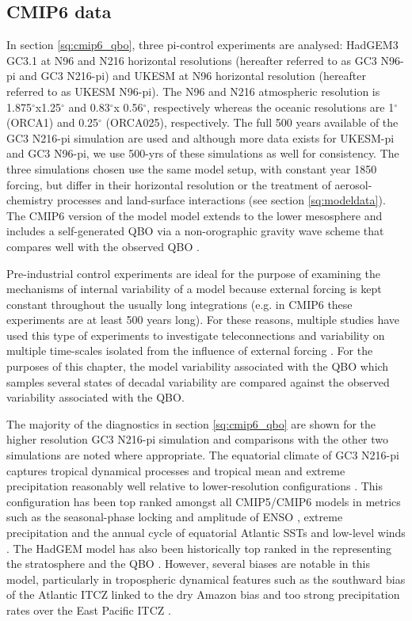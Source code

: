 \subsection{CMIP6 data}
In section \ref{sq:cmip6_qbo}, three pi-control experiments are analysed: HadGEM3 GC3.1 at N96 and N216 horizontal resolutions (hereafter referred to as GC3 N96-pi and GC3 N216-pi) and UKESM at N96 horizontal resolution (hereafter referred to as UKESM N96-pi). The N96 and N216 atmospheric resolution is 1.875$^\circ$x1.25$^\circ$ and 0.83$^\circ$x 0.56$^\circ$, respectively whereas the oceanic resolutions are 1$^\circ$ (ORCA1) and 0.25$^\circ$  (ORCA025), respectively. The full 500 years available of the GC3 N216-pi simulation are used and although more data exists for UKESM-pi and GC3 N96-pi, we use 500-yrs of these simulations as well for consistency. 
The three simulations chosen use the same model setup, with constant year 1850 forcing, but differ in their horizontal resolution or the treatment of aerosol-chemistry processes and land-surface interactions (see section \ref{sq:modeldata}). 
 The CMIP6 version of the model model extends to the lower mesosphere and includes a self-generated QBO via a non-orographic gravity wave scheme that compares well with the observed QBO \citep{richter2020}. 

Pre-industrial control experiments are ideal for the purpose of examining the mechanisms of internal variability of a model because external forcing is kept constant throughout the usually long integrations (e.g. in CMIP6 these experiments are at least 500 years long). For these reasons, multiple studies have used this type of experiments to investigate teleconnections and variability on multiple time-scales isolated from the influence of external forcing \citep[see e.g.][]{watanabe2012uncertainty,zanchettin2014,palmer2014internal,menary2018,dimdore2021,villamayor2021causes}. For the purposes of this chapter, the model variability associated with the QBO which samples several states of decadal variability are compared against the observed variability associated with the QBO. 

The majority of the diagnostics in section \ref{sq:cmip6_qbo} are shown for the higher resolution GC3 N216-pi simulation and comparisons with the other two simulations are noted where appropriate. The equatorial climate of GC3 N216-pi  captures tropical dynamical processes and tropical mean and extreme precipitation reasonably well relative to lower-resolution configurations \citep{garciafranco2020,abdelmoaty2021biases}. This configuration has been top ranked amongst all CMIP5/CMIP6 models in metrics such as the seasonal-phase locking and amplitude of ENSO \citep{menary2018,richter2020overview,liu2021enso}, extreme precipitation \citep{abdelmoaty2021biases} and the annual cycle of equatorial Atlantic SSTs and low-level winds \citep{richter2020overview}. 
  The HadGEM model has also been historically top ranked in the representing the stratosphere and the QBO \citep{schenzinger2017,richter2020}.
  However, several biases are notable in this model, particularly in tropospheric dynamical features such as the southward bias of the Atlantic ITCZ linked to the dry Amazon bias and too strong precipitation rates over the East Pacific ITCZ \citep{garciafranco2020}.


